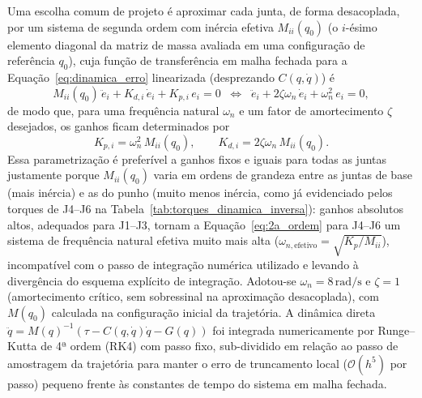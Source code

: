Uma escolha comum de projeto é aproximar cada junta, de forma desacoplada,
por um sistema de segunda ordem com inércia efetiva $M_{ii}(q_0)$ (o
$i$-ésimo elemento diagonal da matriz de massa avaliada em uma configuração
de referência $q_0$), cuja função de transferência em malha fechada para a
Equação~\eqref{eq:dinamica_erro} linearizada (desprezando $C(q,\dot q)$) é
\begin{equation}
M_{ii}(q_0)\,\ddot e_i + K_{d,i}\,\dot e_i + K_{p,i}\,e_i = 0
\;\;\Longleftrightarrow\;\;
\ddot e_i + 2\zeta\omega_n\,\dot e_i + \omega_n^2\,e_i = 0,
\label{eq:2a_ordem}
\end{equation}
de modo que, para uma frequência natural $\omega_n$ e um fator de
amortecimento $\zeta$ desejados, os ganhos ficam determinados por
\begin{equation}
K_{p,i} = \omega_n^2\, M_{ii}(q_0), \qquad
K_{d,i} = 2\zeta\omega_n\, M_{ii}(q_0).
\label{eq:ganhos_wn_zeta}
\end{equation}
Essa parametrização é preferível a ganhos fixos e iguais para todas as
juntas justamente porque $M_{ii}(q_0)$ varia em ordens de grandeza entre as
juntas de base (mais inércia) e as do punho (muito menos inércia, como já
evidenciado pelos torques de J4--J6 na Tabela~\ref{tab:torques_dinamica_inversa}):
ganhos absolutos altos, adequados para J1--J3, tornam a Equação~\eqref{eq:2a_ordem}
para J4--J6 um sistema de frequência natural efetiva muito mais alta
($\omega_{n,\text{efetivo}} = \sqrt{K_p/M_{ii}}$), incompatível com o passo
de integração numérica utilizado e levando à divergência do esquema
explícito de integração. Adotou-se $\omega_n = 8\,\text{rad/s}$ e
$\zeta = 1$ (amortecimento crítico, sem sobressinal na aproximação
desacoplada), com $M(q_0)$ calculada na configuração inicial da
trajetória. A dinâmica direta $\ddot q = M(q)^{-1}(\tau - C(q,\dot q)\dot q
- G(q))$ foi integrada numericamente por Runge--Kutta de 4ª ordem (RK4)
com passo fixo, sub-dividido em relação ao passo de amostragem da
trajetória para manter o erro de truncamento local ($\mathcal{O}(h^5)$ por
passo) pequeno frente às constantes de tempo do sistema em malha fechada.